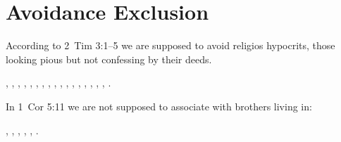 \section{Avoidance Exclusion}

According to 2~Tim 3:1--5 we are supposed to avoid religios hypocrits, those looking pious but not confessing by their deeds.

, 
, 
, 
, 
, 
, 
, 
, 
, 
, 
, 
, 
, 
,
, 
, 
, 
.

In 1~Cor 5:11 we are not supposed to associate with brothers living in: 

, 
, 
, 
, 
, 
.
